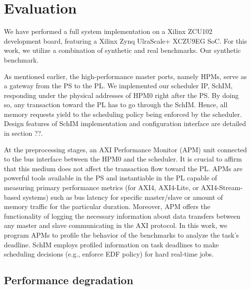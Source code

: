 \section{Evaluation}

We have performed a full system implementation on a Xilinx ZCU102 development board, featuring a Xilinx Zynq UlraScale+ XCZU9EG SoC. For this work, we utilize a combination of synthetic and real benchmarks. Our synthetic benchmark.

As mentioned earlier, the high-performance master ports, namely HPMs, serve as a gateway from the PS to the PL. We implemented our scheduler IP, SchIM, responding under the physical addresses of HPM0 right after the PS. By doing so, any transaction toward the PL has to go through the SchIM. Hence, all memory requests yield to the scheduling policy being enforced by the scheduler. Design features of SchIM implementation and configuration interface are detailed in section ??.


At the preprocessing stages, an AXI Performance Monitor (APM) unit connected to the bus interface between the HPM0 and the scheduler. It is crucial to affirm that this medium does not affect the transaction flow toward the PL.  APMs are powerful tools available in the PS and instantiable in the PL capable of measuring primary performance metrics (for AXI4, AXI4-Lite, or AXI4-Stream-based systems) such as bus latency for specific master/slave or amount of memory traffic for the particular duration. Moreover, APM offers the functionality of logging the necessary information about data transfers between any master and slave communicating in the AXI protocol. In this work, we program APMs to profile the behavior of the benchmarks to analyze the task's deadline. SchIM employs profiled information on task deadlines to make scheduling decisions (e.g., enforce EDF policy) for hard real-time jobs.

  \subsection{Performance degradation}

